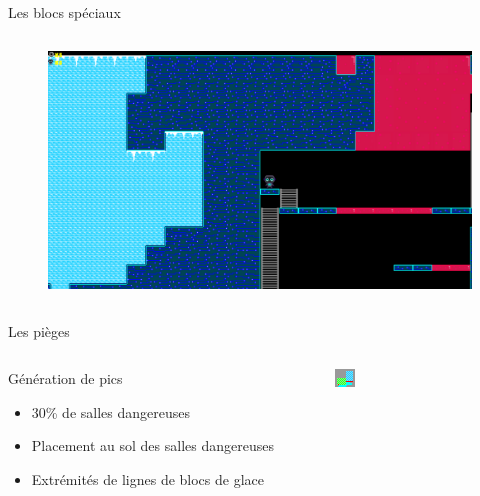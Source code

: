 \documentclass{beamer}
\begin{document}
{\begin{frame}{Les blocs spéciaux}
\begin{columns}
\begin{figure}
            \centering
            \includegraphics[width=1.0\textwidth]{perlin_noise_in_level}
        \end{figure}
    \end{columns}
\end{frame}

\begin{frame}{Les pièges}
    \begin{columns}
        \begin{block}{Génération de pics}
            \begin{itemize}
                \item[\bullet] 30\% de salles dangereuses
                \item[\bullet] Placement au sol des salles dangereuses
                \item[\bullet] Extrémités de lignes de blocs de glace
            \end{itemize}
        \end{block}
        \begin{figure}
            \centering
            \includegraphics[width=1.0\textwidth]{ice_spike_trap}
        \end{figure}
    \end{columns}
\end{frame}

}
\end{document}
